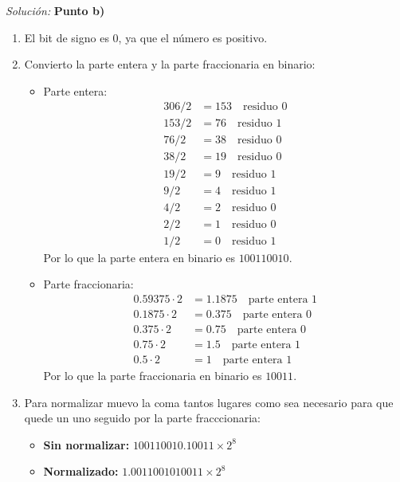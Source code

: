 \documentclass{article}
\newenvironment{solution}
    {\textit{Solución:}}
    {}
\begin{document}
\begin{solution}
\textbf{Punto b)}
\begin{enumerate}
    \item El bit de signo es $0$, ya que el número es positivo.
    \item Convierto la parte entera y la parte fraccionaria en binario:
    \begin{itemize}
        \item Parte entera:
        \begin{align*}
            306/2 &= 153 \quad \text{residuo } 0\\
            153/2 &= 76 \quad \text{residuo } 1\\
            76/2 &= 38 \quad \text{residuo } 0\\
            38/2 &= 19 \quad \text{residuo } 0\\
            19/2 &= 9 \quad \text{residuo } 1\\
            9/2 &= 4 \quad \text{residuo } 1\\
            4/2 &= 2 \quad \text{residuo } 0\\
            2/2 &= 1 \quad \text{residuo } 0\\
            1/2 &= 0 \quad \text{residuo } 1
        \end{align*}
        Por lo que la parte entera en binario es $100110010$.
        \item Parte fraccionaria:
        \begin{align*}
            0.59375 \cdot 2 &= 1.1875 \quad \text{parte entera } 1\\
            0.1875 \cdot 2 &= 0.375 \quad \text{parte entera } 0\\
            0.375 \cdot 2 &= 0.75 \quad \text{parte entera } 0\\
            0.75 \cdot 2 &= 1.5 \quad \text{parte entera } 1\\
            0.5 \cdot 2 &= 1 \quad \text{parte entera } 1
        \end{align*}
        Por lo que la parte fraccionaria en binario es $10011$.
    \end{itemize}
    \item Para normalizar muevo la coma tantos lugares como sea necesario para que quede un uno seguido por la parte fracccionaria:
        \begin{itemize}
            \item \textbf{Sin normalizar:} $100110010.10011 \times 2^8$
            \item \textbf{Normalizado:} $1.0011001010011 \times 2^{8}$

\end{itemize}
\end{enumerate}
\end{solution}
\end{document}
